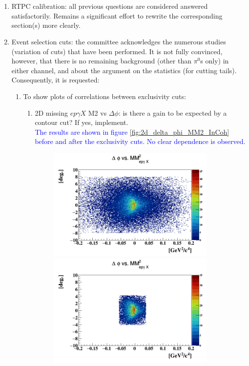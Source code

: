 \section*{}

\begin{enumerate}
\item RTPC calibration: all previous questions are considered answered 
satisfactorily. Remains a significant effort to rewrite the corresponding 
section(s) more clearly.

\item Event selection cuts: the committee acknowledges the numerous studies 
(variation of cuts) that have been performed. It is not fully convinced, 
however, that there is no remaining background (other than $\pi^{0}$s only) in 
either channel, and about the argument on the statistics (for cutting tails).  
Consequently, it is requested:
\begin{enumerate}
\item To show plots of correlations between exclusivity cuts:
\begin{enumerate}
  \item 2D missing $ep\gamma X$ M2 vs $\Delta \phi$: is there a gain to be 
     expected by a contour cut? If yes, implement.\\
    \textcolor{blue}{The results are shown in figure 
       \ref{fig:2d_delta_phi_MM2_InCoh} before and after the exclusivity cuts.  
    No clear dependence is observed.}  \begin{figure}[!h]
    \includegraphics[height=5.6cm]{fig/delta_phi_epgamma_M2_Mis.png}
    \includegraphics[height=5.6cm]{fig/delta_phi_epgamma_M2_Mis_with.png}

\end{figure}
\end{enumerate}
\end{enumerate}
\end{enumerate}
